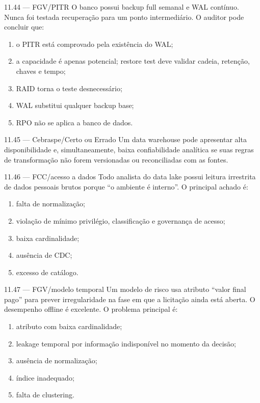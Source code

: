 \begin{questao}{ 11.44 — FGV/PITR}
O banco possui backup full semanal e WAL contínuo. Nunca foi testada recuperação para um ponto intermediário. O auditor pode concluir que:
\begin{enumerate}[label=\Alph*)]
\item o PITR está comprovado pela existência do WAL;
\item a capacidade é apenas potencial; restore test deve validar cadeia, retenção, chaves e tempo;
\item RAID torna o teste desnecessário;
\item WAL substitui qualquer backup base;
\item RPO não se aplica a banco de dados.
\end{enumerate}
\end{questao}

\begin{questao}{ 11.45 — Cebraspe/Certo ou Errado}
Um data warehouse pode apresentar alta disponibilidade e, simultaneamente, baixa confiabilidade analítica se suas regras de transformação não forem versionadas ou reconciliadas com as fontes.
\end{questao}

\begin{questao}{ 11.46 — FCC/acesso a dados}
Todo analista do data lake possui leitura irrestrita de dados pessoais brutos porque ``o ambiente é interno''. O principal achado é:
\begin{enumerate}[label=\Alph*)]
\item falta de normalização;
\item violação de mínimo privilégio, classificação e governança de acesso;
\item baixa cardinalidade;
\item ausência de CDC;
\item excesso de catálogo.
\end{enumerate}
\end{questao}

\begin{questao}{ 11.47 — FGV/modelo temporal}
Um modelo de risco usa atributo ``valor final pago'' para prever irregularidade na fase em que a licitação ainda está aberta. O desempenho offline é excelente. O problema principal é:
\begin{enumerate}[label=\Alph*)]
\item atributo com baixa cardinalidade;
\item leakage temporal por informação indisponível no momento da decisão;
\item ausência de normalização;
\item índice inadequado;
\item falta de clustering.
\end{enumerate}
\end{questao}

